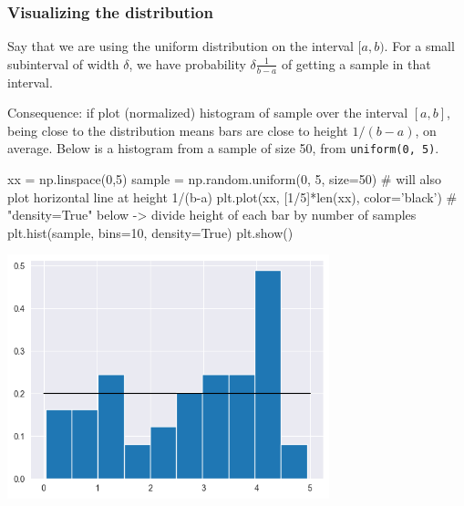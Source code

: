 \documentclass{beamer}
\newenvironment{codeblock}
    {\hfill\begin{beamerboxesrounded}[lower=codecol, width=0.8\textwidth]
    \medskip

    }
    { 
    \end{beamerboxesrounded}\hfill
    }
\theoremstyle{example}
\newcommand{\ttt}[1]{{\small\texttt{#1}}}
\begin{document}
\begin{frame}[fragile]
\frametitle{Visualizing the distribution}
Say that we are using the uniform distribution on the interval $[a,b)$. For a small subinterval of width $\delta$, we have probability $\delta\frac{1}{b-a}$ of getting a sample in that interval.

Consequence: if plot (normalized) histogram of sample over the interval $[a,b]$, being close to the distribution means bars are close to height $1/(b-a)$, on average. Below is a histogram from a sample of size 50, from \ttt{uniform(0, 5)}.

\begin{codeblock}

\begin{python}
xx = np.linspace(0,5)
sample = np.random.uniform(0, 5, size=50)
# will also plot horizontal line at height 1/(b-a)
plt.plot(xx, [1/5]*len(xx), color='black')
# "density=True" below -> divide height of each bar by number of samples
plt.hist(sample, bins=10, density=True)
plt.show()
\end{python}

\end{codeblock}

\includegraphics[width=0.7\textwidth]{histogram_of_sample1.png}

\end{frame}
\end{document}
